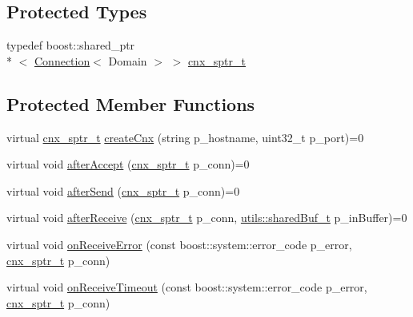 \subsection*{Protected Types}
\begin{DoxyCompactItemize}
\item 
typedef boost\-::shared\-\_\-ptr\\*
$<$ \hyperlink{classxtd_1_1network_1_1base_1_1Connection}{Connection}$<$ Domain $>$ $>$ \hyperlink{classxtd_1_1network_1_1base_1_1Server_aea8c26b2edf1f6c8802db01b3c6b6036}{cnx\-\_\-sptr\-\_\-t}
\end{DoxyCompactItemize}
\subsection*{Protected Member Functions}
\begin{DoxyCompactItemize}
\item 
virtual \hyperlink{classxtd_1_1network_1_1base_1_1Server_aea8c26b2edf1f6c8802db01b3c6b6036}{cnx\-\_\-sptr\-\_\-t} \hyperlink{classxtd_1_1network_1_1base_1_1Server_a4ab9c2f5d30622f1ca4166c7126a16f5}{create\-Cnx} (string p\-\_\-hostname, uint32\-\_\-t p\-\_\-port)=0
\item 
virtual void \hyperlink{classxtd_1_1network_1_1base_1_1Server_a872b44334ff62df80a5a19502ca867b2}{after\-Accept} (\hyperlink{classxtd_1_1network_1_1base_1_1Server_aea8c26b2edf1f6c8802db01b3c6b6036}{cnx\-\_\-sptr\-\_\-t} p\-\_\-conn)=0
\item 
virtual void \hyperlink{classxtd_1_1network_1_1base_1_1Server_a64224be1bf7d053bfbbbaf5c6be00f31}{after\-Send} (\hyperlink{classxtd_1_1network_1_1base_1_1Server_aea8c26b2edf1f6c8802db01b3c6b6036}{cnx\-\_\-sptr\-\_\-t} p\-\_\-conn)=0
\item 
virtual void \hyperlink{classxtd_1_1network_1_1base_1_1Server_a29450e21c9aba7147eb26ac9563efd01}{after\-Receive} (\hyperlink{classxtd_1_1network_1_1base_1_1Server_aea8c26b2edf1f6c8802db01b3c6b6036}{cnx\-\_\-sptr\-\_\-t} p\-\_\-conn, \hyperlink{namespacextd_1_1network_1_1utils_a92b366b7e2a1ab09ac4f4a0401f8fb84}{utils\-::shared\-Buf\-\_\-t} p\-\_\-in\-Buffer)=0
\item 
virtual void \hyperlink{classxtd_1_1network_1_1base_1_1Server_a5fb03fd67e85a6315c0b591f12feaaeb}{on\-Receive\-Error} (const boost\-::system\-::error\-\_\-code p\-\_\-error, \hyperlink{classxtd_1_1network_1_1base_1_1Server_aea8c26b2edf1f6c8802db01b3c6b6036}{cnx\-\_\-sptr\-\_\-t} p\-\_\-conn)
\item 
virtual void \hyperlink{classxtd_1_1network_1_1base_1_1Server_a2692cfb3f754e05b032564a289ea361c}{on\-Receive\-Timeout} (const boost\-::system\-::error\-\_\-code p\-\_\-error, \hyperlink{classxtd_1_1network_1_1base_1_1Server_aea8c26b2edf1f6c8802db01b3c6b6036}{cnx\-\_\-sptr\-\_\-t} p\-\_\-conn)

\end{DoxyCompactItemize}
